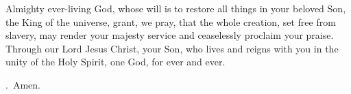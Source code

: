 \lettrine[lines=3]{A}{}lmighty ever-living God, whose will is to restore all things in your beloved Son, the King of the universe, grant, we pray, that the whole creation, set free from slavery, may render your majesty service and ceaselessly proclaim your praise. Through our Lord Jesus Christ, your Son, who lives and reigns with you in the unity of the Holy Spirit, one God, for ever and ever. \par \Rbar.~Amen. 
